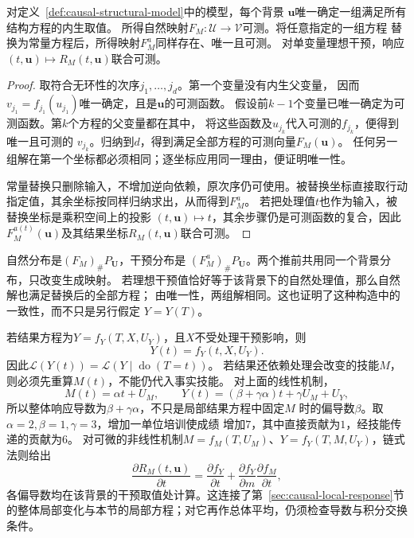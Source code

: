 \begin{theorem}[无环机制的唯一可测响应]
  \label{thm:causal-acyclic-response}
  对定义~\ref{def:causal-structural-model}中的模型，每个背景
  \(\bm u\)唯一确定一组满足所有结构方程的内生取值。
  所得自然映射\(F_M:\mathcal U\to\mathcal V\)可测。将任意指定的一组方程
  替换为常量方程后，所得映射\(F_M^a\)同样存在、唯一且可测。
  对单变量理想干预，响应\((t,\bm u)\mapsto R_M(t,\bm u)\)联合可测。
\end{theorem}
\begin{proof}
  取符合无环性的次序\(j_1,\ldots,j_d\)。第一个变量没有内生父变量，
  因而\(v_{j_1}=f_{j_1}(u_{j_1})\)唯一确定，且是\(\bm u\)的可测函数。
  假设前\(k-1\)个变量已唯一确定为可测函数。第\(k\)个方程的父变量都在其中，
  将这些函数及\(u_{j_k}\)代入可测的\(f_{j_k}\)，便得到唯一且可测的
  \(v_{j_k}\)。归纳到\(d\)，得到满足全部方程的可测向量\(F_M(\bm u)\)。
  任何另一组解在第一个坐标都必须相同；逐坐标应用同一理由，便证明唯一性。

  常量替换只删除输入，不增加逆向依赖，原次序仍可使用。被替换坐标直接取行动
  指定值，其余坐标按同样归纳求出，从而得到\(F_M^a\)。
  若把处理值\(t\)也作为输入，被替换坐标是乘积空间上的投影
  \((t,\bm u)\mapsto t\)，其余步骤仍是可测函数的复合，因此
  \(F_M^{a(t)}(\bm u)\)及其结果坐标\(R_M(t,\bm u)\)联合可测。
\end{proof}

自然分布是\((F_M)_{\#}P_{\bm U}\)，干预分布是
\((F_M^a)_{\#}P_{\bm U}\)。两个推前共用同一个背景分布，只改变生成映射。
若理想干预值恰好等于该背景下的自然处理值，那么自然解也满足替换后的全部方程；
由唯一性，两组解相同。这也证明了这种构造中的一致性，而不只是另行假定
\(Y=Y(T)\)。

若结果方程为\(Y=f_Y(T,X,U_Y)\)，且\(X\)不受处理干预影响，则
\begin{equation}
  Y(t)=f_Y(t,X,U_Y).
  \label{eq:causal-scm-potential-outcome}
\end{equation}
因此\(\mathcal L(Y(t))=\mathcal L(Y\mid\operatorname{do}(T=t))\)。
若结果还依赖处理会改变的技能\(M\)，则必须先重算\(M(t)\)，不能仍代入事实技能。
对上面的线性机制，
\[
  M(t)=\alpha t+U_M,\qquad
  Y(t)=(\beta+\gamma\alpha)t+\gamma U_M+U_Y,
\]
所以整体响应导数为\(\beta+\gamma\alpha\)，不只是局部结果方程中固定\(M\)
时的偏导数\(\beta\)。取\(\alpha=2,\beta=1,\gamma=3\)，增加一单位培训使成绩
增加\(7\)，其中直接贡献为\(1\)，经技能传递的贡献为\(6\)。
对可微的非线性机制\(M=f_M(T,U_M)\)、\(Y=f_Y(T,M,U_Y)\)，链式法则给出
\[
  \frac{\partial R_M(t,\bm u)}{\partial t}
  =
  \frac{\partial f_Y}{\partial t}
  +
  \frac{\partial f_Y}{\partial m}
  \frac{\partial f_M}{\partial t},
\]
各偏导数均在该背景的干预取值处计算。这连接了第~\ref{sec:causal-local-response}节
的整体局部变化与本节的局部方程；对它再作总体平均，仍须检查导数与积分交换条件。

